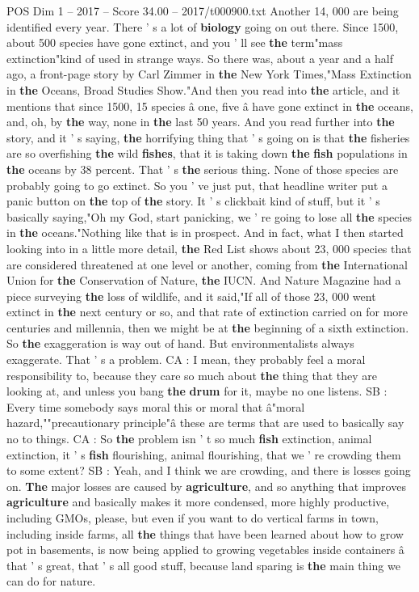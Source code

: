 \begin{textsample}{POS Dim 1 – 2017 – Score 34.00 – 2017/t000900.txt}
Another 14, 000 are being identified every year.
There ' s a lot of \textbf{biology} going on out there.
Since 1500, about 500 species have gone extinct, and you ' ll see \textbf{the} term"mass extinction"kind of used in strange ways.
So there was, about a year and a half ago, a front-page story by Carl Zimmer in \textbf{the} New York Times,"Mass Extinction in \textbf{the} Oceans, Broad Studies Show."And then you read into \textbf{the} article, and it mentions that since 1500, 15 species â one, five â have gone extinct in \textbf{the} oceans, and, oh, by \textbf{the} way, none in \textbf{the} last 50 years.
And you read further into \textbf{the} story, and it ' s saying, \textbf{the} horrifying thing that ' s going on is that \textbf{the} fisheries are so overfishing \textbf{the} wild \textbf{fishes}, that it is taking down \textbf{the} \textbf{fish} populations in \textbf{the} oceans by 38 percent.
That ' s \textbf{the} serious thing.
None of those species are probably going to go extinct.
So you ' ve just put, that headline writer put a panic button on \textbf{the} top of \textbf{the} story.
It ' s clickbait kind of stuff, but it ' s basically saying,"Oh my God, start panicking, we ' re going to lose all \textbf{the} species in \textbf{the} oceans."Nothing like that is in prospect.
And in fact, what I then started looking into in a little more detail, \textbf{the} Red List shows about 23, 000 species that are considered threatened at one level or another, coming from \textbf{the} International Union for \textbf{the} Conservation of Nature, \textbf{the} IUCN.
And Nature Magazine had a piece surveying \textbf{the} loss of wildlife, and it said,"If all of those 23, 000 went extinct in \textbf{the} next century or so, and that rate of extinction carried on for more centuries and millennia, then we might be at \textbf{the} beginning of a sixth extinction.
So \textbf{the} exaggeration is way out of hand.
But environmentalists always exaggerate.
That ' s a problem.
CA : I mean, they probably feel a moral responsibility to, because they care so much about \textbf{the} thing that they are looking at, and unless you bang \textbf{the} \textbf{drum} for it, maybe no one listens.
SB : Every time somebody says moral this or moral that â"moral hazard,""precautionary principle"â these are terms that are used to basically say no to things.
CA : So \textbf{the} problem isn ' t so much \textbf{fish} extinction, animal extinction, it ' s \textbf{fish} flourishing, animal flourishing, that we ' re crowding them to some extent?
SB : Yeah, and I think we are crowding, and there is losses going on. \textbf{The} major losses are caused by \textbf{agriculture}, and so anything that improves \textbf{agriculture} and basically makes it more condensed, more highly productive, including GMOs, please, but even if you want to do vertical farms in town, including inside farms, all \textbf{the} things that have been learned about how to grow pot in basements, is now being applied to growing vegetables inside containers â that ' s great, that ' s all good stuff, because land sparing is \textbf{the} main thing we can do for nature.

\end{textsample}

